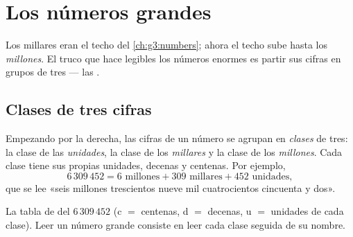 \chapter{Los números grandes}\label{ch:g4:numbers}

Los millares eran el techo del \cref{ch:g3:numbers}; ahora el techo
sube hasta los \emph{millones}. El truco que hace legibles los números enormes
es partir sus cifras en grupos de tres --- las .

\section{Clases de tres cifras}

\begin{definition}[Clases]\label{def:g4:numbers:classes}
Empezando por la derecha, las cifras de un número se agrupan en
\emph{clases} de tres: la clase de las \emph{unidades}, la clase de los
\emph{millares} y la clase de los \emph{millones}. Cada clase tiene sus
propias unidades, decenas y centenas. Por ejemplo,
\[
6\,309\,452 = 6 \text{ millones} + 309 \text{ millares}
+ 452 \text{ unidades},
\]
que se lee «seis millones trescientos nueve mil cuatrocientos
cincuenta y dos».
\end{definition}

\begin{omfigure}

{\small La tabla de  del $6\,309\,452$ (c $=$ centenas, d $=$
decenas, u $=$ unidades de cada clase). Leer un número grande consiste en
leer cada clase seguida de su nombre.}
\end{omfigure}

